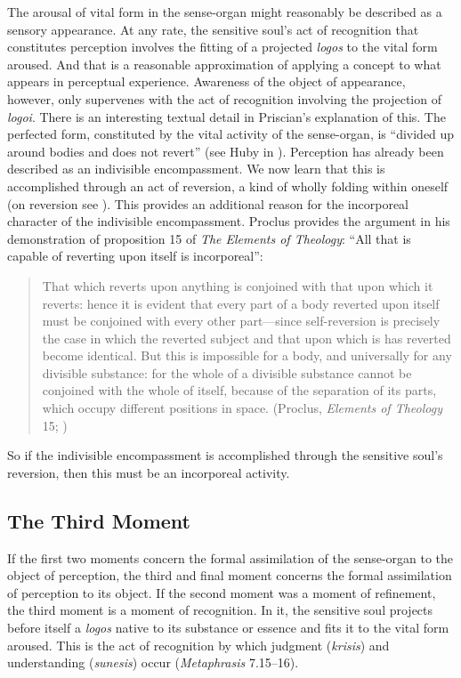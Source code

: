 \documentclass[12pt]{article}
\begin{document}
The arousal of vital form in the sense-organ might reasonably be described as a sensory appearance. At any rate, the sensitive soul's act of recognition that constitutes perception involves the fitting of a projected \emph{logos} to the vital form aroused. And that is a reasonable approximation of applying a concept to what appears in perceptual experience. Awareness of the object of appearance, however, only supervenes with the act of recognition involving the projection of \emph{logoi}. There is an interesting textual detail in Priscian's explanation of this. The perfected form, constituted by the vital activity of the sense-organ, is ``divided up around bodies and does not revert'' (see Huby in \citealt[51 n.31]{Sorabji:1997ly}). Perception has already been described as an indivisible encompassment. We now learn that this is accomplished through an act of reversion, a kind of wholly folding within oneself (on reversion see \citealt[126-30]{Lloyd:1990dp}). This provides an additional reason for the incorporeal character of the indivisible encompassment. Proclus provides the argument in his demonstration of proposition 15 of \emph{The Elements of Theology}: ``All that is capable of reverting upon itself is incorporeal'':
\begin{quote}
	That which reverts upon anything is conjoined with that upon which it reverts: hence it is evident that every part of a body reverted upon itself must be conjoined with every other part---since self-reversion is precisely the case in which the reverted subject and that upon which is has reverted become identical. But this is impossible for a body, and universally for any divisible substance: for the whole of a divisible substance cannot be conjoined with the whole of itself, because of the separation of its parts, which occupy different positions in space. (Proclus, \emph{Elements of Theology} 15; \citealt[18--19]{Dodds:1963ul})
\end{quote}
So if the indivisible encompassment is accomplished through the sensitive soul's reversion, then this must be an incorporeal activity. 


\subsection{The Third Moment} %
\label{sub:the_third_moment}

If the first two moments concern the formal assimilation of the sense-organ to the object of perception, the third and final moment concerns the formal assimilation of perception to its object. If the second moment was a moment of refinement, the third moment is a moment of recognition. In it, the sensitive soul projects before itself a \emph{logos} native to its substance or essence and fits it to the vital form aroused. This is the act of recognition by which judgment (\emph{krisis}) and understanding (\emph{sunesis}) occur (\emph{Metaphrasis} 7.15--16).
\end{document}
